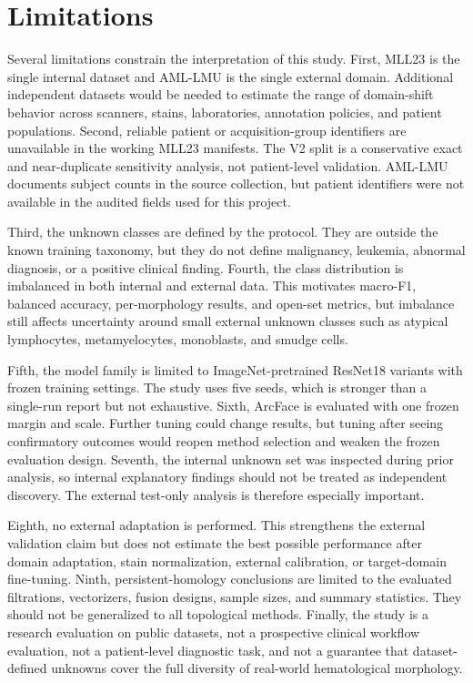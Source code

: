 \section{Limitations}

Several limitations constrain the interpretation of this study. First, MLL23 is the single internal dataset and AML-LMU is the single external domain. Additional independent datasets would be needed to estimate the range of domain-shift behavior across scanners, stains, laboratories, annotation policies, and patient populations. Second, reliable patient or acquisition-group identifiers are unavailable in the working MLL23 manifests. The V2 split is a conservative exact and near-duplicate sensitivity analysis, not patient-level validation. AML-LMU documents subject counts in the source collection, but patient identifiers were not available in the audited fields used for this project.

Third, the unknown classes are defined by the protocol. They are outside the known training taxonomy, but they do not define malignancy, leukemia, abnormal diagnosis, or a positive clinical finding. Fourth, the class distribution is imbalanced in both internal and external data. This motivates macro-F1, balanced accuracy, per-morphology results, and open-set metrics, but imbalance still affects uncertainty around small external unknown classes such as atypical lymphocytes, metamyelocytes, monoblasts, and smudge cells.

Fifth, the model family is limited to ImageNet-pretrained ResNet18 variants with frozen training settings. The study uses five seeds, which is stronger than a single-run report but not exhaustive. Sixth, ArcFace is evaluated with one frozen margin and scale. Further tuning could change results, but tuning after seeing confirmatory outcomes would reopen method selection and weaken the frozen evaluation design. Seventh, the internal unknown set was inspected during prior analysis, so internal explanatory findings should not be treated as independent discovery. The external test-only analysis is therefore especially important.

Eighth, no external adaptation is performed. This strengthens the external validation claim but does not estimate the best possible performance after domain adaptation, stain normalization, external calibration, or target-domain fine-tuning. Ninth, persistent-homology conclusions are limited to the evaluated filtrations, vectorizers, fusion designs, sample sizes, and summary statistics. They should not be generalized to all topological methods. Finally, the study is a research evaluation on public datasets, not a prospective clinical workflow evaluation, not a patient-level diagnostic task, and not a guarantee that dataset-defined unknowns cover the full diversity of real-world hematological morphology.
